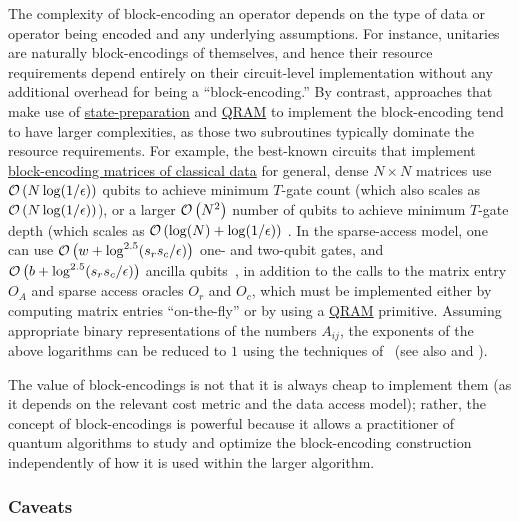 \begin{refsection}
The complexity of block-encoding an operator depends on the type of data or operator being encoded and any underlying assumptions. For instance, unitaries are naturally block-encodings of themselves, and hence their resource requirements depend entirely on their circuit-level implementation without any additional overhead for being a ``block-encoding.'' By contrast, approaches that make use of \hyperref[prim:StatePrepData]{state-preparation} and \hyperref[prim:QRAM]{QRAM} to implement the block-encoding tend to have larger complexities, as those two subroutines typically dominate the resource requirements. For example, the best-known circuits that implement \hyperref[prim:BlockEncodingsClassical]{block-encoding matrices of classical data} for general, dense $N\times N$ matrices use $\mathcal{O}\left( N\log(1/\epsilon) \right)$ qubits to achieve minimum $T$-gate count (which also scales as $\mathcal{O}\left( N \log(1/\epsilon) \right)$), or a larger $\mathcal{O}\left( N^2 \right)$ number of qubits to achieve minimum $T$-gate depth (which scales as $\mathcal{O}\left( \log(N)+\log(1/\epsilon) \right)$ \cite{clader2022resourcesForBlockEncoding}. 
In the sparse-access model, one can use $\mathcal{O}\left( w+\log^{2.5}(s_rs_c/\epsilon) \right)$ one- and two-qubit gates, and $\mathcal{O}\left( b+ \log^{2.5}(s_rs_c/\epsilon) \right)$ ancilla qubits~\cite{gilyen2018QSingValTransf}, in addition to the calls to the matrix entry $O_A$ and sparse access oracles $O_r$ and $O_c$, which must be implemented either by computing matrix entries ``on-the-fly'' or by using a \hyperref[prim:QRAM]{QRAM} primitive. Assuming appropriate binary representations of the numbers $A_{ij}$, the exponents of the above logarithms can be reduced to $1$ using the techniques of~\cite{sanders2019BlackBoxQuantumStatePreparation} (see also \cite[Section III.D]{babbush2018EncodingElectronicSpectraLinearT} and \cite[Supplementary Material VII.A.2]{burg2021QuantumComputingEnhancedComputationalCataylysis}).

The value of block-encodings is not that it is always cheap to implement them (as it depends on the relevant cost metric and the data access model); rather, the concept of block-encodings is powerful because it allows a practitioner of quantum algorithms to study and optimize the block-encoding construction independently of how it is used within the larger algorithm.


\subsubsection*{Caveats}


\end{refsection}

